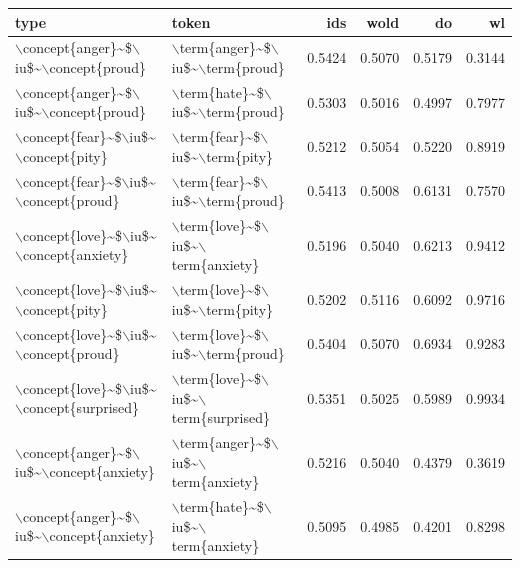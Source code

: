 \begin{table}[ht]
\centering
\label{tab:iu_raw}
\begin{tabular}{llrrrr}
  \hline
type & token & ids & wold & do & wl \\ 
  \hline
$\backslash$concept\{anger\}\~{}\$$\backslash$iu\$\~{}$\backslash$concept\{proud\} & $\backslash$term\{anger\}\~{}\$$\backslash$iu\$\~{}$\backslash$term\{proud\} & 0.5424 & 0.5070 & 0.5179 & 0.3144 \\ 
  $\backslash$concept\{anger\}\~{}\$$\backslash$iu\$\~{}$\backslash$concept\{proud\} & $\backslash$term\{hate\}\~{}\$$\backslash$iu\$\~{}$\backslash$term\{proud\} & 0.5303 & 0.5016 & 0.4997 & 0.7977 \\ 
  $\backslash$concept\{fear\}\~{}\$$\backslash$iu\$\~{}$\backslash$concept\{pity\} & $\backslash$term\{fear\}\~{}\$$\backslash$iu\$\~{}$\backslash$term\{pity\} & 0.5212 & 0.5054 & 0.5220 & 0.8919 \\ 
  $\backslash$concept\{fear\}\~{}\$$\backslash$iu\$\~{}$\backslash$concept\{proud\} & $\backslash$term\{fear\}\~{}\$$\backslash$iu\$\~{}$\backslash$term\{proud\} & 0.5413 & 0.5008 & 0.6131 & 0.7570 \\ 
  $\backslash$concept\{love\}\~{}\$$\backslash$iu\$\~{}$\backslash$concept\{anxiety\} & $\backslash$term\{love\}\~{}\$$\backslash$iu\$\~{}$\backslash$term\{anxiety\} & 0.5196 & 0.5040 & 0.6213 & 0.9412 \\ 
  $\backslash$concept\{love\}\~{}\$$\backslash$iu\$\~{}$\backslash$concept\{pity\} & $\backslash$term\{love\}\~{}\$$\backslash$iu\$\~{}$\backslash$term\{pity\} & 0.5202 & 0.5116 & 0.6092 & 0.9716 \\ 
  $\backslash$concept\{love\}\~{}\$$\backslash$iu\$\~{}$\backslash$concept\{proud\} & $\backslash$term\{love\}\~{}\$$\backslash$iu\$\~{}$\backslash$term\{proud\} & 0.5404 & 0.5070 & 0.6934 & 0.9283 \\ 
  $\backslash$concept\{love\}\~{}\$$\backslash$iu\$\~{}$\backslash$concept\{surprised\} & $\backslash$term\{love\}\~{}\$$\backslash$iu\$\~{}$\backslash$term\{surprised\} & 0.5351 & 0.5025 & 0.5989 & 0.9934 \\ 
  $\backslash$concept\{anger\}\~{}\$$\backslash$iu\$\~{}$\backslash$concept\{anxiety\} & $\backslash$term\{anger\}\~{}\$$\backslash$iu\$\~{}$\backslash$term\{anxiety\} & 0.5216 & 0.5040 & 0.4379 & 0.3619 \\ 
  $\backslash$concept\{anger\}\~{}\$$\backslash$iu\$\~{}$\backslash$concept\{anxiety\} & $\backslash$term\{hate\}\~{}\$$\backslash$iu\$\~{}$\backslash$term\{anxiety\} & 0.5095 & 0.4985 & 0.4201 & 0.8298 \\ 

\end{tabular}
\end{table}
